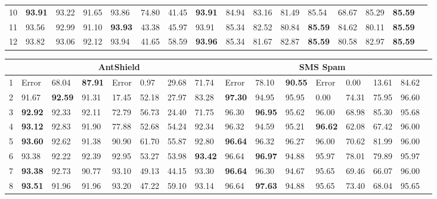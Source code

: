 \documentclass{article}
\theoremstyle{definition}
\theoremstyle{remark}
\begin{document}
\begin{table}[]
\begin{tabular}{| p{0.5cm}|p{0.6cm}|p{0.7cm}|p{0.7cm}|p{0.6cm}|p{0.6cm}|p{0.6cm}|p{0.6cm}|p{0.6cm}|p{0.7cm}|p{0.7cm}|p{0.6cm}|p{0.6cm}|p{0.6cm}|p{0.6cm}|p{0.6cm}|}
10 	&	\textbf{93.91}&	93.22&	91.65&93.86   & 74.80 & 41.45 & \textbf{93.91} & 84.94&	83.16&	81.49&	85.54&	68.67&	85.29&	\textbf{85.59} \\
11 	&	93.56&	92.99&	91.10&\textbf{93.93}   & 43.38 & 45.97 & 93.91 & 85.34&	82.52&	80.84&	\textbf{85.59}&	84.62&	80.11&	\textbf{85.59} \\
12 	&	93.82&	93.06&	92.12&93.94   & 41.65 & 58.59 & \textbf{93.96} & 85.34&	81.67&	82.87&	\textbf{85.59}&	80.58&	82.97&	\textbf{85.59} \\ \hline
    \end{tabular}
 \begin{tabular}{| p{0.5cm}|p{0.6cm}|p{0.7cm}|p{0.7cm}|p{0.6cm}|p{0.6cm}|p{0.6cm}|p{0.6cm}|p{0.6cm}|p{0.7cm}|p{0.7cm}|p{0.6cm}|p{0.6cm}|p{0.6cm}|p{0.6cm}|p{0.6cm}|} \hline
\rowcolor{black!20}
& \multicolumn{7}{c|}{\textbf{AntShield}} &  \multicolumn{7}{|c|}{\textbf{SMS Spam}}\\ \hline
1	& Error	& 68.04&	\textbf{87.91}&	Error&	0.97&	29.68&	71.74&	Error	& 78.10&	\textbf{90.55}&	Error&	0.00&	13.61&	84.62\\
2	& 91.67&	\textbf{92.59}&	91.31&	17.45&	52.18&	27.97&	83.28&	\textbf{97.30}&	94.95&	95.95&	0.00&	74.31&	75.95&	96.60\\
3	& \textbf{92.92}&	92.33&	92.11&	72.79&	56.73&	24.40&	71.75&	96.30&	\textbf{96.95}&	95.62&	96.00&	68.98&	85.30&	95.68\\
4	& \textbf{93.12}&	92.83&	91.90&	77.88&	52.68&	54.24&	92.34&	96.32&	94.59&	95.21&	\textbf{96.62}&	62.08&	67.42&	96.00\\
5	& \textbf{93.60}&	92.62&	91.38&	90.90&	61.70&	55.87&	92.80&	\textbf{96.64}&	96.32&	96.27&	96.00&	70.62&	81.99&	96.00\\
6	& 93.38&	92.22&	92.39&	92.95&	53.27&	53.98&	\textbf{93.42}&	96.64&	\textbf{96.97}&	94.88&	95.97&	78.01&	79.89&	95.97\\
7	& \textbf{93.38}&	92.73&	90.77&	93.10&	49.13&	44.15&	93.30&	\textbf{96.64}&	96.30&	94.67&	95.65&	69.46&	66.07&	96.00\\
8	& \textbf{93.51}&	91.96&	91.96&	93.20&	47.22&	59.10&	93.14&	96.64&	\textbf{97.63}&	94.88&	95.65&	73.40&	68.04&	95.65\\

\end{tabular}
\end{table}
\end{document}

